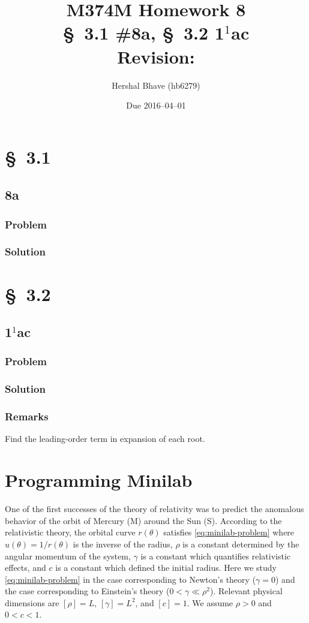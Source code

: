 \documentclass[12pt]{article}
\title{M374M Homework 8 \\
  \normalsize{\S~3.1 \#8a, \S~3.2 1$^1$ac} \\
  Revision: }
\author{Hershal Bhave (hb6279)}
\date{Due 2016--04--01}
\begin{document}
\maketitle

\section{\S~3.1}
\subsection{8a}
\subsubsection*{Problem}
\subsubsection*{Solution}

\section{\S~3.2}
\subsection{1$^1$ac}
\subsubsection*{Problem}
\subsubsection*{Solution}
\subsubsection*{Remarks}
Find the leading-order term in expansion of each root.

\section{Programming Minilab}
One of the first successes of the theory of relativity was to predict the
anomalous behavior of the orbit of Mercury (M) around the Sun (S). According to
the relativistic theory, the orbital curve $r(\theta)$ satisfies
\cref{eq:minilab-problem} where $u(\theta)=1/r(\theta)$ is the inverse of the
radius, $\rho$ is a constant determined by the angular momentum of the system,
$\gamma$ is a constant which quantifies relativistic effects, and $c$ is a
constant which defined the initial radius. Here we study
\cref{eq:minilab-problem} in the case corresponding to Newton's theory
($\gamma=0$) and the case corresponding to Einstein's theory
($0<\gamma\ll\rho^2$). Relevant physical dimensions are $[\rho]=L$,
$[\gamma]=L^2$, and $[c]=1$. We assume $\rho>0$ and $0<c<1$.
\end{document}
